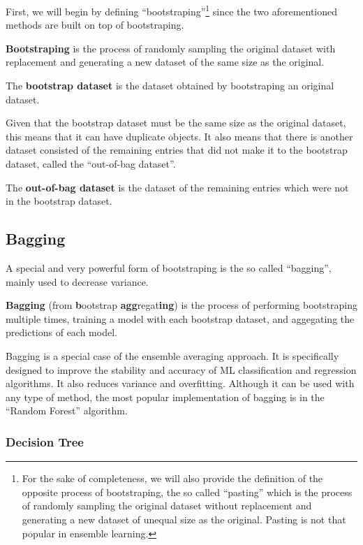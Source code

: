 First, we will begin by defining ``bootstraping''\footnote{For the sake of completeness, we will also provide the
definition of the opposite process of bootstraping, the so called ``pasting'' which is the process of randomly sampling
the original dataset without replacement and generating a new dataset of unequal size as the original. Pasting is not
that popular in ensemble learning.} since the two aforementioned methods are built on top of bootstraping.

\bd[Bootstraping]
\textbf{Bootstraping} is the process of randomly sampling the original dataset with replacement and generating a new
dataset of the same size as the original.
\ed

The \textbf{bootstrap dataset} is the dataset obtained by bootstraping an original dataset.
\ed

Given that the bootstrap dataset must be the same size as the original dataset, this means that it can have
duplicate objects. It also means that there is another dataset consisted of the remaining entries that did not
make it to the bootstrap dataset, called the ``out-of-bag dataset''.

The \textbf{out-of-bag dataset} is the dataset of the remaining entries which were not in the bootstrap dataset.
\ed


\subsection{Bagging}

A special and very powerful form of bootstraping is the so called ``bagging'', mainly used to decrease variance.

\bd[Bagging]
\textbf{Bagging} (from \textbf{b}ootstrap \textbf{agg}regat\textbf{ing}) is the process of performing bootstraping
multiple times, training a model with each bootstrap dataset, and aggegating the predictions of each model.
\ed


Bagging is a special case of the ensemble averaging approach. It is specifically designed to improve the stability
and accuracy of ML classification and regression algorithms. It also reduces variance and overfitting. Although it can
be used with any type of method, the most popular implementation of bagging is in the ``Random Forest'' algorithm.

\subsubsection{Decision Tree}

